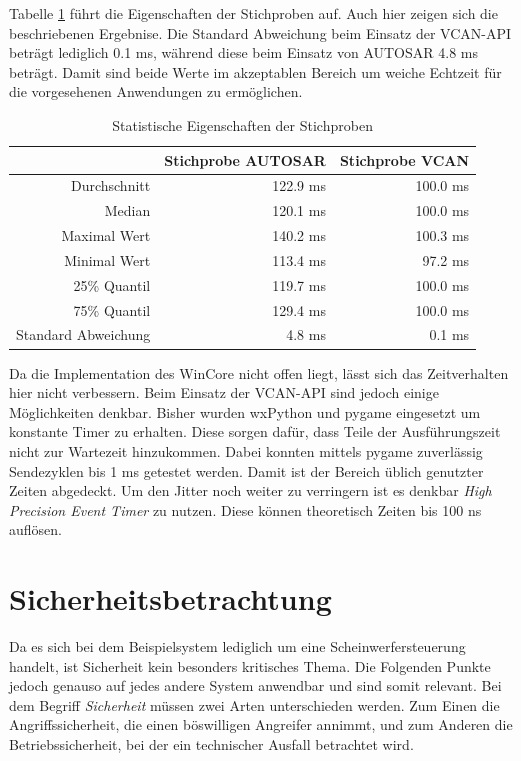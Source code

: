 \documentclass[
  a4paper,					    %
  twoside,
  DIV=calc,     				%
  bibliography=totoc,
  cleardoublepage=empty,
  ngerman,     					%
  final       					%
]{scrbook}
\begin{document}
Tabelle \ref{tab:jitter_statistik} führt die Eigenschaften der Stichproben auf. Auch hier zeigen sich die beschriebenen Ergebnise. Die Standard Abweichung beim Einsatz der VCAN-API beträgt lediglich 0.1 ms, während diese beim Einsatz von AUTOSAR 4.8 ms beträgt. Damit sind beide Werte im akzeptablen Bereich um weiche Echtzeit für die vorgesehenen Anwendungen zu ermöglichen.

\begin{table}[ht]
    \centering
    \begin{tabular}[h]{r  r r}
            & Stichprobe AUTOSAR & Stichprobe VCAN\\
        \toprule
        Durchschnitt        & 122.9 ms & 100.0 ms\\
        Median              & 120.1 ms & 100.0 ms\\
        Maximal Wert        & 140.2 ms & 100.3 ms\\
        Minimal Wert        & 113.4 ms & 97.2 ms\\
        25\% Quantil        & 119.7 ms & 100.0 ms\\
        75\% Quantil        & 129.4 ms & 100.0 ms\\
        Standard Abweichung & 4.8 ms & 0.1 ms\\
        \bottomrule
    \end{tabular}
    \caption{Statistische Eigenschaften der Stichproben}
    \label{tab:jitter_statistik}
\end{table}

Da die Implementation des WinCore nicht offen liegt, lässt sich das Zeitverhalten hier nicht verbessern. Beim Einsatz der VCAN-API sind jedoch einige Möglichkeiten denkbar. Bisher wurden wxPython und pygame eingesetzt um konstante Timer zu erhalten. Diese sorgen dafür, dass Teile der Ausführungszeit nicht zur Wartezeit hinzukommen. Dabei konnten mittels pygame zuverlässig Sendezyklen bis 1 ms getestet werden. Damit ist der Bereich üblich genutzter Zeiten abgedeckt. Um den Jitter noch weiter zu verringern ist es denkbar \emph{High Precision Event Timer} zu nutzen. Diese können theoretisch Zeiten bis 100 ns auflösen.



\section{Sicherheitsbetrachtung}
\label{sec:Sicherheit_Beispiel}
Da es sich bei dem Beispielsystem lediglich um eine Scheinwerfersteuerung handelt, ist Sicherheit kein besonders kritisches Thema. Die Folgenden Punkte jedoch genauso auf jedes andere System anwendbar und sind somit relevant. Bei dem Begriff \emph{Sicherheit} müssen zwei Arten unterschieden werden. Zum Einen die Angriffssicherheit, die einen böswilligen Angreifer annimmt, und zum Anderen die Betriebssicherheit, bei der ein technischer Ausfall betrachtet wird.
\end{document}
